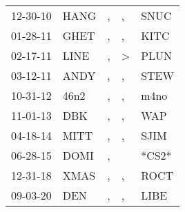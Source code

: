 \begin{supertabular}{lllll}
 12-30-10 &  HANG &  , &             , &   SNUC \\
 01-28-11 &  GHET &  , &             , &   KITC \\
 02-17-11 &  LINE &  , &  \textgreater &   PLUN \\
 03-12-11 &  ANDY &  , &             , &   STEW \\
 10-31-12 &  46n2 &  , &             , &   m4no \\
 11-01-13 &   DBK &  , &             , &    WAP \\
 04-18-14 &  MITT &  , &             , &   SJIM \\
 06-28-15 &  DOMI &  , &               &  *CS2* \\
 12-31-18 &  XMAS &  , &             , &   ROCT \\
 09-03-20 &   DEN &  , &             , &   LIBE \\
\end{supertabular}
